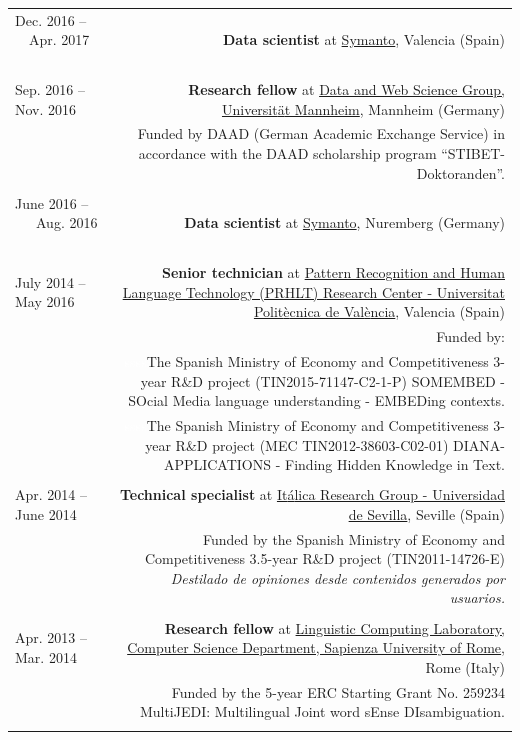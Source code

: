 \documentclass[10pt]{article}
\begin{document}
\begin{tabular}{L!{\VRule}R}
Dec. 2016 -- ~~Apr. 2017 ~~&{\textbf{Data scientist} at \href{https://www.symanto.com/}{Symanto}, Valencia (Spain)}\\&\\
Sep. 2016 -- Nov. 2016 ~~&{\textbf{Research fellow} at \href{http://dws.informatik.uni-mannheim.de/en/home/}{Data and Web Science Group, Universit{\"a}t Mannheim}, Mannheim (Germany)}\\
&\scriptsize{Funded by DAAD (German Academic Exchange Service) in accordance with the DAAD scholarship program ``STIBET-Doktoranden''.}\\&\\

June 2016 -- ~~~Aug. 2016 ~~&{\textbf{Data scientist} at \href{https://www.symanto.com/}{Symanto}, Nuremberg (Germany)}\\&\\

July 2014 -- May 2016 ~~&{\textbf{Senior technician} at \href{http://www.prhlt.upv.es/}{Pattern Recognition and Human Language Technology (PRHLT) Research Center - Universitat Polit{\`e}cnica de Val{\`e}ncia}, Valencia (Spain)}\\
&\scriptsize{Funded by:}\\
&\scriptsize{\textcolor{white}{ssss}The Spanish Ministry of Economy and Competitiveness 3-year R\&D project (TIN2015-71147-C2-1-P) SOMEMBED - SOcial Media language 
understanding - EMBEDing contexts.}\\
&\scriptsize{\textcolor{white}{ssss}The Spanish Ministry of Economy and Competitiveness 3-year R\&D project (MEC TIN2012-38603-C02-01) DIANA-APPLICATIONS - Finding Hidden Knowledge 
in Text.}\\&\\

Apr. 2014 -- June 2014~~~~&{\textbf{Technical specialist} at \href{http://www.lsi.us.es/italica/}{It{\'a}lica Research Group - Universidad de Sevilla}, Seville (Spain)}\\
&\scriptsize{Funded by the Spanish Ministry of Economy and Competitiveness 3.5-year R\&D project (TIN2011-14726-E) \emph{Destilado de opiniones desde contenidos generados por 
usuarios.}}\\&\\
 
Apr. 2013 -- Mar. 2014 ~~&{\textbf{Research fellow} at \href{http://lcl.uniroma1.it/index.html}{Linguistic Computing Laboratory, Computer Science Department, Sapienza University of Rome}, Rome (Italy)}\\
&\scriptsize{Funded by the 5-year ERC Starting Grant No. 259234 MultiJEDI: Multilingual Joint word sEnse DIsambiguation.}\\&\\


\end{tabular}
\end{document}
